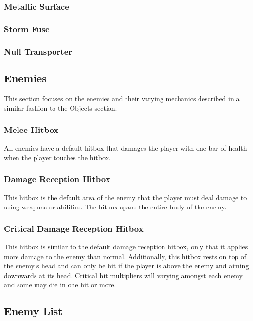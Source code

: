 \documentclass[12pt]{article}
\begin{document}
\subsubsection{Metallic Surface}

\subsubsection{Storm Fuse}

\subsubsection{Null Transporter}

\subsection{Enemies}

This section focuses on the enemies and their varying mechanics described in a similar fashion to the Objects section. 

\subsubsection{Melee Hitbox}

All enemies have a default hitbox that damages the player with one bar of health when the player touches the hitbox. 

\subsubsection{Damage Reception Hitbox}

This hitbox is the default area of the enemy that the player must deal damage to using weapons or abilities. The hitbox spans the entire body of the enemy.

\subsubsection{Critical Damage Reception Hitbox}

This hitbox is similar to the default damage reception hitbox, only that it applies more damage to the enemy than normal. Additionally, this hitbox rests on top of the enemy's head and can only be hit if the player is above the enemy and aiming downwards at its head. Critical hit multipliers will varying amongst each enemy and some may die in one hit or more. 

\subsection{Enemy List}
\end{document}
